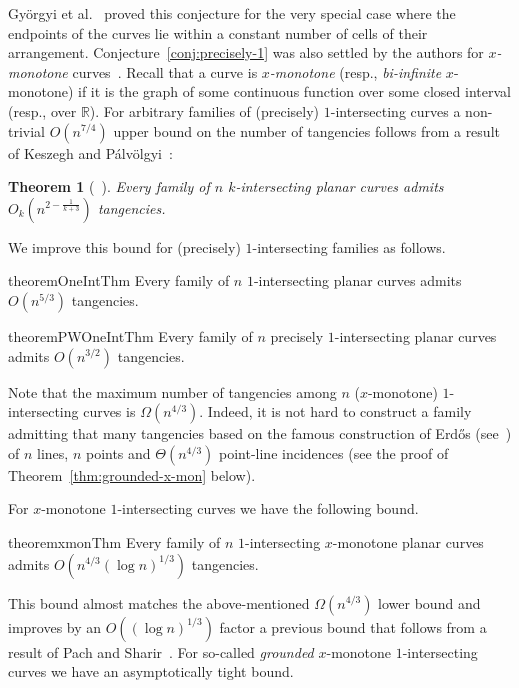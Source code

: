 \documentclass[11pt]{article}
\newtheorem{theorem}{Theorem}
\theoremstyle{definition}
\begin{document}
Gy{\"o}rgyi et al.~\cite{GYORGYI201829} proved this conjecture for the very special case where the endpoints of the curves lie within a constant number of cells of their arrangement.
Conjecture~\ref{conj:precisely-1} was also settled by the authors for \emph{$x$-monotone} curves~\cite{x-mon}.
Recall that a curve is \emph{$x$-monotone} (resp., \emph{bi-infinite} $x$-monotone) if it is the graph of some continuous function over some closed interval (resp., over $\mathbb{R}$).
For arbitrary families of (precisely) $1$-intersecting curves a non-trivial $O(n^{7/4})$ upper bound on the number of tangencies follows from a result of Keszegh and P{\'a}lv{\"o}lgyi~\cite{KP23}:

\begin{theorem}[~\cite{KP23}]\label{thm:KP}
	Every family of $n$ $k$-intersecting planar curves admits $O_k\left(n^{2-\frac{1}{k+3}}\right)$ tangencies.
\end{theorem}

We improve this bound for (precisely) $1$-intersecting families as follows.

\begin{restatable}{theorem}{OneIntThm}\label{thm:1-int}
	Every family of $n$ $1$-intersecting planar curves admits $O(n^{5/3})$ tangencies.
\end{restatable}

\begin{restatable}{theorem}{PWOneIntThm}\label{thm:precisely-1-int}
	Every family of $n$ precisely $1$-intersecting planar curves admits $O(n^{3/2})$ tangencies.
\end{restatable}

Note that the maximum number of tangencies among $n$ ($x$-monotone) $1$-intersecting curves is $\Omega(n^{4/3})$.
Indeed, it is not hard to construct a family admitting that many tangencies based on the famous construction of Erd\H{o}s (see~\cite{pachbook}) of $n$ lines, $n$ points and $\Theta(n^{4/3})$ point-line incidences (see the proof of Theorem~\ref{thm:grounded-x-mon} below).

For $x$-monotone $1$-intersecting curves we have the following bound.
\begin{restatable}{theorem}{xmonThm}\label{thm:x-mon}
	Every family of $n$ $1$-intersecting $x$-monotone planar curves admits $O\left(n^{4/3}(\log n)^{1/3}\right)$ tangencies.
\end{restatable}

This bound almost matches the above-mentioned $\Omega(n^{4/3})$ lower bound and improves by an $O\left((\log n)^{1/3}\right)$ factor a previous bound that follows from a result of Pach and Sharir~\cite{Pach-Sharir}.
For so-called \emph{grounded} $x$-monotone $1$-intersecting curves we have an asymptotically tight bound.
\end{document}
